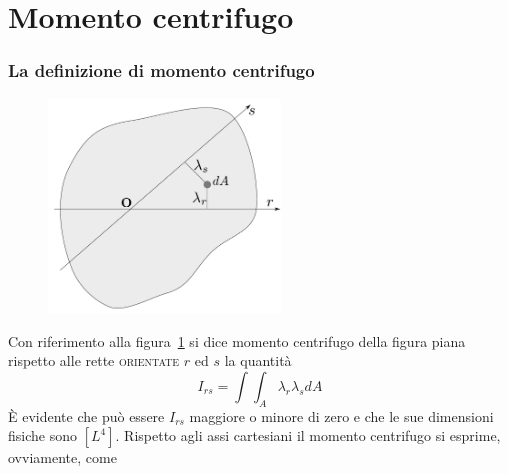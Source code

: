 \pagestyle{fancy}
\part{Momento centrifugo}
\setcounter{section}{0}
\section{La definizione di momento centrifugo}
\renewcommand{\thefigure}{3~-~1}
\begin{figure}[ht]
\centering
\includegraphics[width=0.55\textwidth]{Immagini/Parte_3/Figura3_1/Figura3_1.pdf}
\caption{}
\label{figura3-1}
\end{figure}
Con riferimento alla figura~\ref{figura3-1} si dice momento centrifugo della figura piana rispetto alle rette \textsc{orientate} $r$ ed $s$ la quantità
\begin{equation} \label{equazione3-1}
\boxed{I_{rs}=\int\int_A \lambda_{r}\lambda_{s}dA} \tag{3.1}
\end{equation}
È evidente che può essere $I_{rs}$ maggiore o minore di zero e che le sue dimensioni fisiche sono $[L^4]$. Rispetto agli assi cartesiani il momento centrifugo si esprime, ovviamente, come
